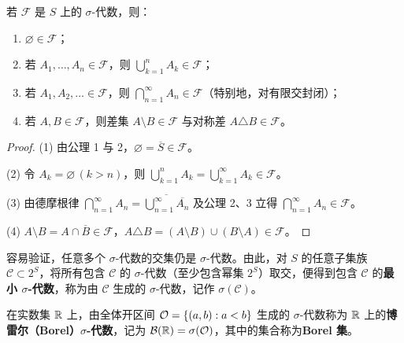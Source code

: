 \begin{proposition}
\label{prop:sigma-algebra-closure}
若 $\mathcal{F}$ 是 $S$ 上的 $\sigma$-代数，则：
\begin{enumerate}
  \item $\varnothing\in\mathcal{F}$；
  \item 若 $A_1,\ldots,A_n\in\mathcal{F}$，则 $\bigcup_{k=1}^{n}A_k\in\mathcal{F}$；
  \item 若 $A_1,A_2,\ldots\in\mathcal{F}$，则 $\bigcap_{n=1}^{\infty}A_n\in\mathcal{F}$（特别地，对有限交封闭）；
  \item 若 $A,B\in\mathcal{F}$，则差集 $A\setminus B\in\mathcal{F}$ 与对称差 $A\triangle B\in\mathcal{F}$。
\end{enumerate}
\end{proposition}
\begin{proof}
(1) 由公理 1 与 2，$\varnothing=\overline{S}\in\mathcal{F}$。

(2) 令 $A_k=\varnothing\,(k>n)$，则 $\bigcup_{k=1}^{n}A_k=\bigcup_{k=1}^{\infty}A_k\in\mathcal{F}$。

(3) 由德摩根律 $\bigcap_{n=1}^{\infty}A_n=\overline{\bigcup_{n=1}^{\infty}\overline{A_n}}$ 及公理 2、3 立得 $\bigcap_{n=1}^{\infty}A_n\in\mathcal{F}$。

(4) $A\setminus B=A\cap\overline{B}\in\mathcal{F}$，$A\triangle B=(A\setminus B)\cup(B\setminus A)\in\mathcal{F}$。
\end{proof}

容易验证，任意多个 $\sigma$-代数的交集仍是 $\sigma$-代数。由此，对 $S$ 的任意子集族 $\mathcal{C}\subset 2^S$，将所有包含 $\mathcal{C}$ 的 $\sigma$-代数（至少包含幂集 $2^S$）取交，便得到包含 $\mathcal{C}$ 的\textbf{最小 $\sigma$-代数}，称为由 $\mathcal{C}$ 生成的 $\sigma$-代数，记作 $\sigma(\mathcal{C})$。

\begin{definition}
\label{def:borel-sigma-algebra}
在实数集 $\mathbb{R}$ 上，由全体开区间 $\mathcal{O}=\{(a,b):a<b\}$ 生成的 $\sigma$-代数称为 $\mathbb{R}$ 上的\textbf{博雷尔（Borel）$\sigma$-代数}，记为 $\mathcal{B}(\mathbb{R})=\sigma(\mathcal{O})$，其中的集合称为\textbf{Borel 集}。
\end{definition}

